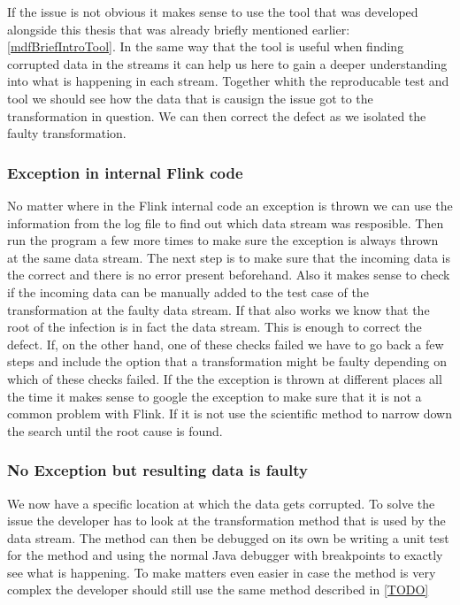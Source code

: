 If the issue is not obvious it makes sense to use the tool that was developed alongside this thesis that was already briefly mentioned earlier: \ref{mdfBriefIntroTool}. In the same way that the tool is useful when finding corrupted data in the streams it can help us here to gain a deeper understanding into what is happening in each stream. Together whith the reproducable test and tool we should see how the data that is causign the issue got to the transformation in question. We can then correct the defect as we isolated the faulty transformation.

\subsubsection{Exception in internal Flink code}
No matter where in the Flink internal code an exception is thrown we can use the information from the log file to find out which data stream was resposible. Then run the program a few more times to make sure the exception is always thrown at the same data stream. The next step is to make sure that the incoming data is the correct and there is no error present beforehand. Also it makes sense to check if the incoming data can be manually added to the test case of the transformation at the faulty data stream. If that also works we know that the root of the infection is in fact the data stream. This is enough to correct the defect. If, on the other hand, one of these checks failed we have to go back a few steps and include the option that a transformation might be faulty depending on which of these checks failed. If the the exception is thrown at different places all the time it makes sense to google the exception to make sure that it is not a common problem with Flink. If it is not use the scientific method to narrow down the search until the root cause is found.

\subsubsection{No Exception but resulting data is faulty}
We now have a specific location at which the data gets corrupted. To solve the issue the developer has to look at the transformation method that is used by the data stream. The method can then be debugged on its own be writing a unit test for the method and using the normal Java debugger with breakpoints to exactly see what is happening. To make matters even easier in case the method is very complex the developer should still use the same method described in \ref{TODO}

